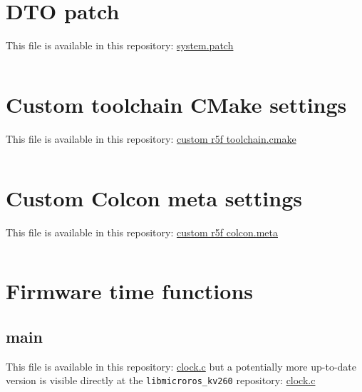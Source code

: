 \documentclass[10pt]{article}
\begin{document}
\pagebreak
\appendix


\section{DTO patch}
\label{sec:org5413d93}
This file is available in this repository: \href{https://gitlab.com/sunoc/xilinx-kria-kv260-documentation/-/blob/b7300116e153f4b5a1542f8804e4646db8030033/src/system.patch}{system.patch}
\inputminted[linenos, frame=single]{diff}{./src/system.patch}

\pagebreak
\section{Custom toolchain CMake settings}
\label{sec:org7aec5f8}
This file is available in this repository: \href{https://gitlab.com/sunoc/xilinx-kria-kv260-documentation/-/blob/b7300116e153f4b5a1542f8804e4646db8030033/src/custom\_r5f\_toolchain.cmake}{custom r5f toolchain.cmake}
\inputminted[linenos, frame=single]{cmake}{./src/custom_r5f_toolchain.cmake}

\pagebreak
\section{Custom Colcon meta settings}
\label{sec:org8b7a4b7}
This file is available in this repository: \href{https://gitlab.com/sunoc/xilinx-kria-kv260-documentation/-/blob/b7300116e153f4b5a1542f8804e4646db8030033/src/custom\_r5f\_colcon.meta}{custom r5f colcon.meta}
\inputminted[linenos, frame=single]{yaml}{./src/custom_r5f_colcon.meta}

\pagebreak
\section{Firmware time functions}
\label{sec:orgb92a586}

\subsection{main}
\label{sec:org9417dc0}
This file is available in this repository: \href{https://gitlab.com/sunoc/xilinx-kria-kv260-documentation/-/blob/b7300116e153f4b5a1542f8804e4646db8030033/src/clock.c}{clock.c}
but a potentially more up-to-date version is visible
directly at the \texttt{libmicroros\_kv260} repository: \href{https://gitlab.com/sunoc/libmicroros\_kv260/-/blob/4867e762f66af7b4647232eb4c0a31106db66e13/src/clock.c}{clock.c}

\inputminted[linenos, frame=single]{c}{./src/clock.c}
\end{document}

